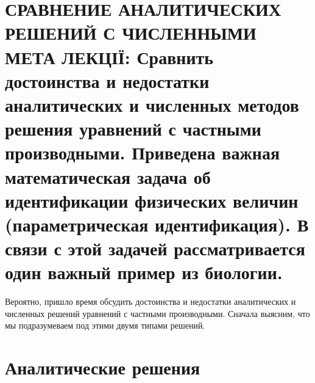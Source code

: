\documentclass[
  ukrainian,
]{article}
\begin{document}
\section{СРАВНЕНИЕ АНАЛИТИЧЕСКИХ РЕШЕНИЙ С ЧИСЛЕННЫМИ МЕТА ЛЕКЦІЇ:
Сравнить достоинства и недостатки аналитических и численных методов
решения уравнений с частными производными. Приведена важная
математическая задача об идентификации физических величин
(параметрическая идентификация). В связи с этой задачей рассматривается
один важный пример из
биологии.}\label{ux441ux440ux430ux432ux43dux435ux43dux438ux435-ux430ux43dux430ux43bux438ux442ux438ux447ux435ux441ux43aux438ux445-ux440ux435ux448ux435ux43dux438ux439-ux441-ux447ux438ux441ux43bux435ux43dux43dux44bux43cux438-ux43cux435ux442ux430-ux43bux435ux43aux446ux456ux457-ux441ux440ux430ux432ux43dux438ux442ux44c-ux434ux43eux441ux442ux43eux438ux43dux441ux442ux432ux430-ux438-ux43dux435ux434ux43eux441ux442ux430ux442ux43aux438-ux430ux43dux430ux43bux438ux442ux438ux447ux435ux441ux43aux438ux445-ux438-ux447ux438ux441ux43bux435ux43dux43dux44bux445-ux43cux435ux442ux43eux434ux43eux432-ux440ux435ux448ux435ux43dux438ux44f-ux443ux440ux430ux432ux43dux435ux43dux438ux439-ux441-ux447ux430ux441ux442ux43dux44bux43cux438-ux43fux440ux43eux438ux437ux432ux43eux434ux43dux44bux43cux438.-ux43fux440ux438ux432ux435ux434ux435ux43dux430-ux432ux430ux436ux43dux430ux44f-ux43cux430ux442ux435ux43cux430ux442ux438ux447ux435ux441ux43aux430ux44f-ux437ux430ux434ux430ux447ux430-ux43eux431-ux438ux434ux435ux43dux442ux438ux444ux438ux43aux430ux446ux438ux438-ux444ux438ux437ux438ux447ux435ux441ux43aux438ux445-ux432ux435ux43bux438ux447ux438ux43d-ux43fux430ux440ux430ux43cux435ux442ux440ux438ux447ux435ux441ux43aux430ux44f-ux438ux434ux435ux43dux442ux438ux444ux438ux43aux430ux446ux438ux44f.-ux432-ux441ux432ux44fux437ux438-ux441-ux44dux442ux43eux439-ux437ux430ux434ux430ux447ux435ux439-ux440ux430ux441ux441ux43cux430ux442ux440ux438ux432ux430ux435ux442ux441ux44f-ux43eux434ux438ux43d-ux432ux430ux436ux43dux44bux439-ux43fux440ux438ux43cux435ux440-ux438ux437-ux431ux438ux43eux43bux43eux433ux438ux438.}

Вероятно, пришло время обсудить достоинства и недостатки аналитических и
численных решений уравнений с частными производными. Сначала выясним,
что мы подразумеваем под этими двумя типами решений.

\section{Аналитические
решения}\label{ux430ux43dux430ux43bux438ux442ux438ux447ux435ux441ux43aux438ux435-ux440ux435ux448ux435ux43dux438ux44f}
\end{document}
